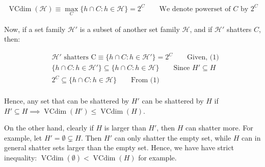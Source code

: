\documentclass[11pt]{article}
\renewcommand{\H}{\ensuremath{\mathcal{H}}}
\DeclareMathOperator{\vcdim}{VCdim}
\newcommand{\Vcdim}{\ensuremath{\vcdim}}
\begin{document}
\begin{align*}
\Vcdim(\H) \equiv \max_{C} \{ h \cap C : h \in \H \} = 2^C \qquad \text{We denote powerset of $C$ by $2^C$ }
\end{align*}

Now, if a set family $\H'$ is a subset of another set family $\H$, and if $\H'$
shatters $C$, then:

\begin{align*}
    &\H' \text{ shatters C} \equiv  \{ h \cap C : h \in \H'\} = 2^C \qquad \text{Given, (1)}\\
    &\{ h \cap C : h \in \H' \} \subseteq \{ h \cap C : h \in \H \} \qquad \text{Since $H' \subseteq H$} \\
    &2^C \subseteq \{ h \cap C : h \in \H \}  \qquad \text{From (1)} \\
\end{align*}

Hence, any set that can be shattered by $H'$ can be shattered by $H$ if
$H' \subseteq H \implies \vcdim(H') \leq \vcdim(H)$.

On the other hand, clearly if $H$ is larger than $H'$, then $H$ can shatter more.
For example, let $H' = \emptyset \subsetneq H$. Then $H'$ can only shatter the empty
set, while $H$ can in general shatter sets larger than the empty set. Hence,
we have have strict inequality: $\vcdim(\emptyset) < \vcdim(H)$ for example.
\end{document}
